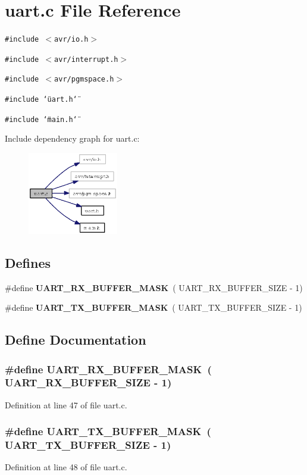\section{uart.c File Reference}
\label{uart_8c}
{\tt \#include $<$avr/io.h$>$}\par
{\tt \#include $<$avr/interrupt.h$>$}\par
{\tt \#include $<$avr/pgmspace.h$>$}\par
{\tt \#include \char`\"{}uart.h\char`\"{}}\par
{\tt \#include \char`\"{}main.h\char`\"{}}\par


Include dependency graph for uart.c:\begin{figure}[H]
\begin{center}
\leavevmode
\includegraphics[width=112pt]{uart_8c__incl}
\end{center}
\end{figure}
\subsection*{Defines}
\begin{CompactItemize}
\item 
\#define {\bf UART\_\-RX\_\-BUFFER\_\-MASK}~( UART\_\-RX\_\-BUFFER\_\-SIZE - 1)
\item 
\#define {\bf UART\_\-TX\_\-BUFFER\_\-MASK}~( UART\_\-TX\_\-BUFFER\_\-SIZE - 1)
\end{CompactItemize}


\subsection{Define Documentation}
\subsubsection{\setlength{\rightskip}{0pt plus 5cm}\#define UART\_\-RX\_\-BUFFER\_\-MASK~( UART\_\-RX\_\-BUFFER\_\-SIZE - 1)}\label{uart_8c_07b20e76327f35ec90e49111cb13164d}




Definition at line 47 of file uart.c.
\subsubsection{\setlength{\rightskip}{0pt plus 5cm}\#define UART\_\-TX\_\-BUFFER\_\-MASK~( UART\_\-TX\_\-BUFFER\_\-SIZE - 1)}\label{uart_8c_7ddb8c271caedb7c17167749946b543d}




Definition at line 48 of file uart.c.